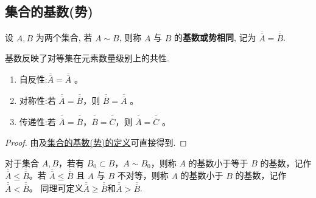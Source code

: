 \documentclass[../../main.tex]{subfiles}
\begin{document}
\subsection{集合的基数(势)}

\begin{definition}[集合的基数(势)]\label{definition:集合的基数(势)}
设 $A, B$ 为两个集合, 若 $A \sim B$, 则称 $A$ 与 $B$ 的\textbf{基数或势相同}, 记为 $\overline{\overline{A}} = \overline{\overline{B}}$.
\end{definition}
\begin{note}
基数反映了对等集在元素数量级别上的共性. 
\end{note}

\begin{theorem}
\begin{enumerate}[(1)]
\item 自反性:$\overline{\overline{A}} = \overline{\overline{A}}$ 。

\item 对称性:若 $\overline{\overline{A}} = \overline{\overline{B}}$，则 $\overline{\overline{B}} = \overline{\overline{A}}$ 。

\item 传递性:若 $\overline{\overline{A}} = \overline{\overline{B}}$，$\overline{\overline{B}} = \overline{\overline{C}}$，则 $\overline{\overline{A}} = \overline{\overline{C}}$ 。
\end{enumerate}
\end{theorem}
\begin{proof}
由及\hyperref[definition:集合的基数(势)]{集合的基数(势)的定义}可直接得到.

\end{proof}

\begin{definition}\label{definition:集合的基数大小关系}
对于集合 $A, B$，若有 $B_0 \subset B$，$A \sim B_0$，则称 $A$ 的基数小于等于 $B$ 的基数，记作 $\overline{\overline{A}} \leqslant\overline{\overline{B}}$。若 $\overline{\overline{A}}\leqslant \overline{\overline{B}}$ 且 $A$ 与 $B$ 不对等，则称 $A$ 的基数小于 $B$ 的基数，记作 $\overline{\overline{A}} < \overline{\overline{B}}$。
同理可定义$\overline{\overline{A}}\geqslant \overline{\overline{B}}$和$\overline{\overline{A}}> \overline{\overline{B}}$.
\end{definition}
\end{document}
